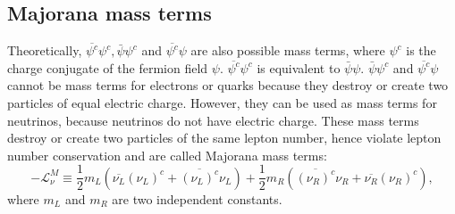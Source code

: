 \subsection{Majorana mass terms}
\label{sec:major}
Theoretically, $\overline{\psi^{c}}\psi^{c}, \bar{\psi}\psi^{c}$ and $\overline{\psi^{c}}\psi$ are also possible mass terms, where $\psi^{c}$ is the charge conjugate of the fermion field $\psi$. $\overline{\psi^{c}} \psi^{c}$ is equivalent to $\bar{\psi}\psi$. $\bar{\psi}\psi^{c}$ and $\overline{\psi^{c}}\psi$ cannot be mass terms for electrons or quarks because they destroy or create two particles of equal electric charge. However, they can be used as mass terms for neutrinos, because neutrinos do not have electric charge. These mass terms destroy or create two particles of the same lepton number, hence violate lepton number conservation and are called Majorana mass terms:
\begin{equation}
  \label{eq:mmt}
  -\mathcal{L}_{\nu}^{M} \equiv \frac{1}{2}m_{L} \left(
    \overline{\nu_{L}}(\nu_{L})^{c} +                  \overline{(\nu_{L})^{c}}\nu_{L}
  \right) + \frac{1}{2}m_{R} \left(
    \overline{(\nu_{R})^{c}}\nu_{R} +                       \overline{\nu_{R}}(\nu_{R})^{c} \right),
\end{equation}
where $m_{L}$ and $m_{R}$ are two independent constants. 

